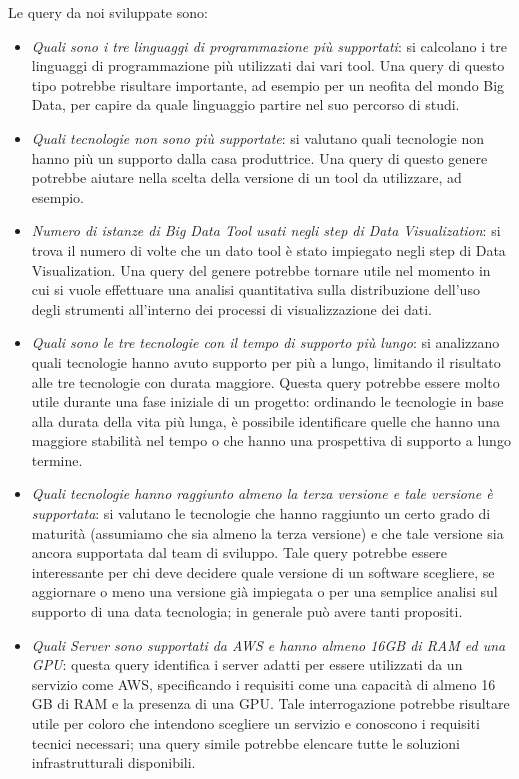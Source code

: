 Le query da noi sviluppate sono:
\begin{itemize}
    \item \textit{Quali sono i tre linguaggi di programmazione più supportati}: si calcolano i tre linguaggi di programmazione più utilizzati dai vari tool. Una query di questo tipo potrebbe risultare importante, ad esempio per un neofita del mondo Big Data, per capire da quale linguaggio partire nel suo percorso di studi.
    \item \textit{Quali tecnologie non sono più supportate}: si valutano quali tecnologie non hanno più un supporto dalla casa produttrice. Una query di questo genere potrebbe aiutare nella scelta della versione di un tool da utilizzare, ad esempio.
    \item \textit{Numero di istanze di Big Data Tool usati negli step di Data Visualization}: si trova il numero di volte che un dato tool è stato impiegato negli step di Data Visualization. Una query del genere potrebbe tornare utile nel momento in cui si vuole effettuare una analisi quantitativa sulla distribuzione dell'uso degli strumenti all'interno dei processi di visualizzazione dei dati.
    \item \textit{Quali sono le tre tecnologie con il tempo di supporto più lungo}: si analizzano quali tecnologie hanno avuto supporto per più a lungo, limitando il risultato alle tre tecnologie con durata maggiore. Questa query potrebbe essere molto utile durante una fase iniziale di un progetto: ordinando le tecnologie in base alla durata della vita più lunga, è possibile identificare quelle che hanno una maggiore stabilità nel tempo o che hanno una prospettiva di supporto a lungo termine.
    \item \textit{Quali tecnologie hanno raggiunto almeno la terza versione e tale versione è supportata}: si valutano le tecnologie che hanno raggiunto un certo grado di maturità (assumiamo che sia almeno la terza versione) e che tale versione sia ancora supportata dal team di sviluppo. Tale query potrebbe essere interessante per chi deve decidere quale versione di un software scegliere, se aggiornare o meno una versione già impiegata o per una semplice analisi sul supporto di una data tecnologia; in generale può avere tanti propositi.\\
    
    \item \textit{Quali Server sono supportati da AWS e hanno almeno 16GB di RAM ed una GPU}: questa query identifica i server adatti per essere utilizzati da un servizio come AWS, specificando i requisiti come una capacità di almeno 16 GB di RAM e la presenza di una GPU. Tale interrogazione potrebbe risultare utile per coloro che intendono scegliere un servizio e conoscono i requisiti tecnici necessari; una query simile potrebbe elencare tutte le soluzioni infrastrutturali disponibili.
\end{itemize}


